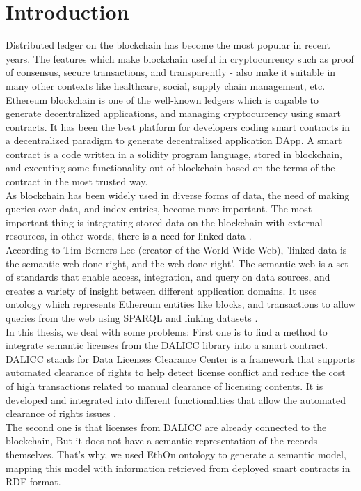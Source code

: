 \section{Introduction}
Distributed ledger on the blockchain has become the most popular in recent years. The features which make blockchain useful in cryptocurrency such as proof of consensus, secure transactions, and transparently - also make it suitable in many other contexts like healthcare, social, supply chain management, etc. \\
Ethereum blockchain is one of the well-known ledgers which is capable to generate decentralized applications, and managing cryptocurrency using smart contracts. It has been the best platform for developers coding smart contracts in a decentralized paradigm to generate decentralized application DApp.
A smart contract is a code written in a solidity program language, stored in blockchain, and executing some functionality out of blockchain based on the terms of the contract in the most trusted way. \\
As blockchain has been widely used in diverse forms of data, the need of making queries over data, and index entries, become more important. The most important thing is integrating stored data on the blockchain with external resources, in other words, there is a need for linked data \cite{Third}. \\
According to Tim-Berners-Lee (creator of the World Wide Web), 'linked data is the semantic web done right, and the web done right'\cite{Hector}. 
 The semantic web is a set of standards that enable access, integration, and query on data sources, and creates a variety of insight between different application domains. It uses ontology which represents Ethereum entities like blocks, and transactions to allow queries from the web using SPARQL and linking datasets \cite{Third}. \\
In this thesis, we deal with some problems: First one is to find a method to integrate semantic licenses from the DALICC library into a smart contract. 
DALICC stands for Data Licenses Clearance Center is a framework that supports automated clearance of rights to help detect license conflict and reduce the cost of high transactions related to manual clearance of licensing contents.
It is developed and integrated into different functionalities that allow the automated clearance of rights issues \cite{Anna}.\\
The second one is that licenses from DALICC are already connected to the blockchain, But it does not have a semantic representation of the records themselves. That's why, we used EthOn ontology to generate a semantic model, mapping this model with information retrieved from deployed smart contracts in RDF format. \\
